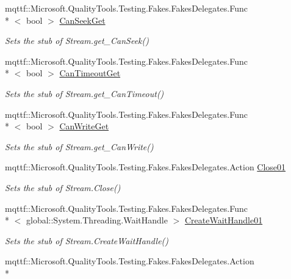 \begin{DoxyCompactItemize}
mqttf\-::\-Microsoft.\-Quality\-Tools.\-Testing.\-Fakes.\-Fakes\-Delegates.\-Func\\*
$<$ bool $>$ \hyperlink{class_system_1_1_i_o_1_1_fakes_1_1_stub_stream_afdce600c6a1daad84fea4e253ff4fa98}{Can\-Seek\-Get}
\begin{DoxyCompactList}\small\item\em Sets the stub of Stream.\-get\-\_\-\-Can\-Seek()\end{DoxyCompactList}\item 
mqttf\-::\-Microsoft.\-Quality\-Tools.\-Testing.\-Fakes.\-Fakes\-Delegates.\-Func\\*
$<$ bool $>$ \hyperlink{class_system_1_1_i_o_1_1_fakes_1_1_stub_stream_a445376ceb0a1ec2ebc39a35843b6d778}{Can\-Timeout\-Get}
\begin{DoxyCompactList}\small\item\em Sets the stub of Stream.\-get\-\_\-\-Can\-Timeout()\end{DoxyCompactList}\item 
mqttf\-::\-Microsoft.\-Quality\-Tools.\-Testing.\-Fakes.\-Fakes\-Delegates.\-Func\\*
$<$ bool $>$ \hyperlink{class_system_1_1_i_o_1_1_fakes_1_1_stub_stream_a4f8bcae7ee2b6c2f1519ddd367c37dcc}{Can\-Write\-Get}
\begin{DoxyCompactList}\small\item\em Sets the stub of Stream.\-get\-\_\-\-Can\-Write()\end{DoxyCompactList}\item 
mqttf\-::\-Microsoft.\-Quality\-Tools.\-Testing.\-Fakes.\-Fakes\-Delegates.\-Action \hyperlink{class_system_1_1_i_o_1_1_fakes_1_1_stub_stream_aef697cd33d1d6e72c48dbdd1aeab0d73}{Close01}
\begin{DoxyCompactList}\small\item\em Sets the stub of Stream.\-Close()\end{DoxyCompactList}\item 
mqttf\-::\-Microsoft.\-Quality\-Tools.\-Testing.\-Fakes.\-Fakes\-Delegates.\-Func\\*
$<$ global\-::\-System.\-Threading.\-Wait\-Handle $>$ \hyperlink{class_system_1_1_i_o_1_1_fakes_1_1_stub_stream_a54a5a447b0dda3bdb22e216a0bf606f2}{Create\-Wait\-Handle01}
\begin{DoxyCompactList}\small\item\em Sets the stub of Stream.\-Create\-Wait\-Handle()\end{DoxyCompactList}\item 
mqttf\-::\-Microsoft.\-Quality\-Tools.\-Testing.\-Fakes.\-Fakes\-Delegates.\-Action\\*

\end{DoxyCompactItemize}
